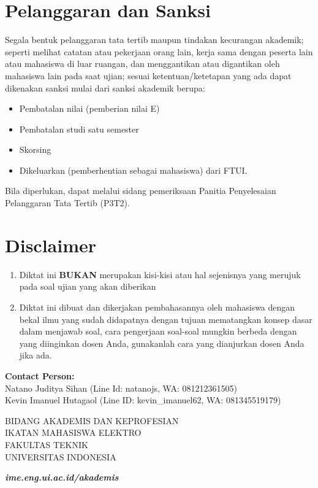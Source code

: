 
\section{Pelanggaran dan Sanksi}
    
\par Segala bentuk pelanggaran tata tertib maupun tindakan kecurangan akademik; seperti melihat catatan atau pekerjaan orang lain, kerja sama dengan peserta lain atau mahasiswa di luar ruangan, dan menggantikan atau digantikan oleh mahasiswa lain pada saat ujian; sesuai ketentuan/ketetapan yang ada dapat dikenakan sanksi mulai dari sanksi akademik berupa: 
\begin{itemize}[noitemsep]
    \item Pembatalan nilai (pemberian nilai E)
    \item Pembatalan studi satu semester
    \item Skorsing
    \item Dikeluarkan (pemberhentian sebagai mahasiswa) dari FTUI.
\end{itemize}
Bila diperlukan, dapat melalui sidang pemeriksaan Panitia Penyelesaian Pelanggaran
Tata Tertib (P3T2).
    \section{Disclaimer}
\begin{enumerate}[label=\Alph*.]
    \item Diktat ini \textbf{BUKAN} merupakan kisi-kisi atau hal sejenisnya yang merujuk pada soal ujian yang akan diberikan
    \item Diktat ini dibuat dan dikerjakan pembahasannya oleh mahasiswa dengan bekal ilmu yang sudah didapatnya dengan tujuan mematangkan konsep dasar dalam menjawab soal, cara pengerjaan soal-soal mungkin berbeda dengan yang diinginkan dosen Anda, gunakanlah cara yang dianjurkan dosen Anda jika ada.
\end{enumerate}


\begin{flushleft}
    \textbf{Contact Person:} \\
    Natano Juditya Sihan (Line Id: natanojs, WA: 081212361505) \\
    Kevin Imanuel Hutagaol (Line ID: kevin\_imanuel62, WA: 081345519179)
\end{flushleft}
\vspace{10pt}
\begin{center} 
    BIDANG AKADEMIS DAN KEPROFESIAN \\
    IKATAN MAHASISWA ELEKTRO \\
    FAKULTAS TEKNIK \\
    UNIVERSITAS INDONESIA 
\end{center}
\begin{flushright} 
    \textbf{\textit{ime.eng.ui.ac.id/akademis}}
\end{flushright}

